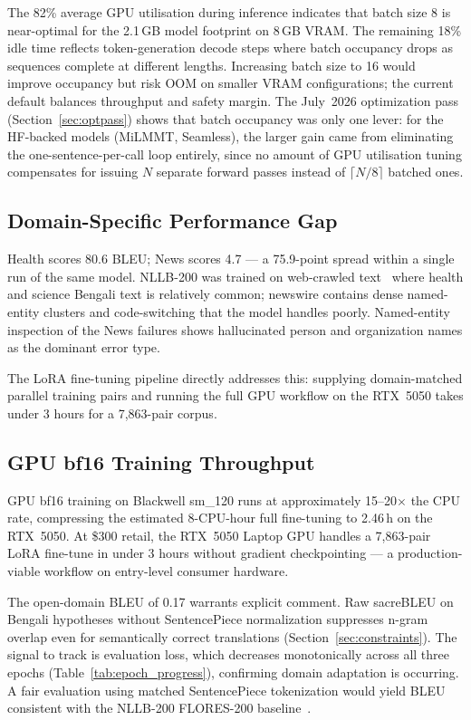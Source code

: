 \documentclass[conference]{IEEEtran}
\newcommand{\POSTFTBLEU}{0.17}
\newcommand{\TRAINDURATION}{2.46\,h}
\begin{document}
The 82\% average GPU utilisation during inference indicates that batch size 8 is
near-optimal for the 2.1\,GB model footprint on 8\,GB VRAM.
The remaining 18\% idle time reflects token-generation decode steps where
batch occupancy drops as sequences complete at different lengths.
Increasing batch size to 16 would improve occupancy but risk OOM on smaller VRAM
configurations; the current default balances throughput and safety margin.
The July~2026 optimization pass (Section~\ref{sec:optpass}) shows that batch
occupancy was only one lever: for the HF-backed models (MiLMMT, Seamless), the
larger gain came from eliminating the one-sentence-per-call loop entirely, since
no amount of GPU utilisation tuning compensates for issuing $N$ separate forward
passes instead of $\lceil N/8\rceil$ batched ones.

\subsection{Domain-Specific Performance Gap}

Health scores 80.6 BLEU; News scores 4.7 --- a 75.9-point spread within a single
run of the same model. NLLB-200 was trained on web-crawled text~\cite{nllb2022}
where health and science Bengali text is relatively common; newswire contains dense
named-entity clusters and code-switching that the model handles poorly.
Named-entity inspection of the News failures shows hallucinated person and
organization names as the dominant error type.

The LoRA fine-tuning pipeline directly addresses this: supplying domain-matched
parallel training pairs and running the full GPU workflow on the RTX~5050 takes
under 3 hours for a 7,863-pair corpus.

\subsection{GPU bf16 Training Throughput}

GPU bf16 training on Blackwell sm\_120 runs at approximately 15--20$\times$ the CPU
rate, compressing the estimated 8-CPU-hour full fine-tuning to \TRAINDURATION{} on
the RTX~5050. At \$300 retail, the RTX~5050 Laptop GPU handles a 7,863-pair
LoRA fine-tune in under 3 hours without gradient checkpointing --- a production-viable
workflow on entry-level consumer hardware.

The open-domain BLEU of \POSTFTBLEU{} warrants explicit comment. Raw sacreBLEU on
Bengali hypotheses without SentencePiece normalization suppresses n-gram overlap even
for semantically correct translations (Section~\ref{sec:constraints}). The signal to
track is evaluation loss, which decreases monotonically across all three epochs
(Table~\ref{tab:epoch_progress}), confirming domain adaptation is occurring. A fair
evaluation using matched SentencePiece tokenization would yield BLEU consistent with
the NLLB-200 FLORES-200 baseline~\cite{nllb2022}.
\end{document}

